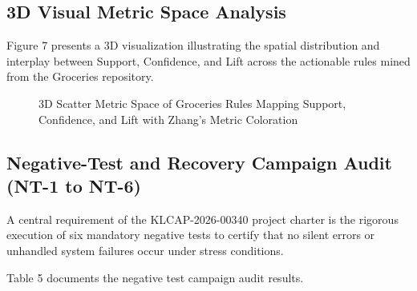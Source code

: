 \documentclass[11pt,a4paper]{article}
\begin{document}
\subsection{3D Visual Metric Space Analysis}
Figure 7 presents a 3D visualization illustrating the spatial distribution and interplay between Support, Confidence, and Lift across the actionable rules mined from the Groceries repository.

\begin{figure}[!ht]
\centering
{}
\caption{3D Scatter Metric Space of Groceries Rules Mapping Support, Confidence, and Lift with Zhang's Metric Coloration}
\end{figure}

\subsection{Negative-Test and Recovery Campaign Audit (NT-1 to NT-6)}
A central requirement of the KLCAP-2026-00340 project charter is the rigorous execution of six mandatory negative tests to certify that no silent errors or unhandled system failures occur under stress conditions.

Table 5 documents the negative test campaign audit results.
\end{document}
